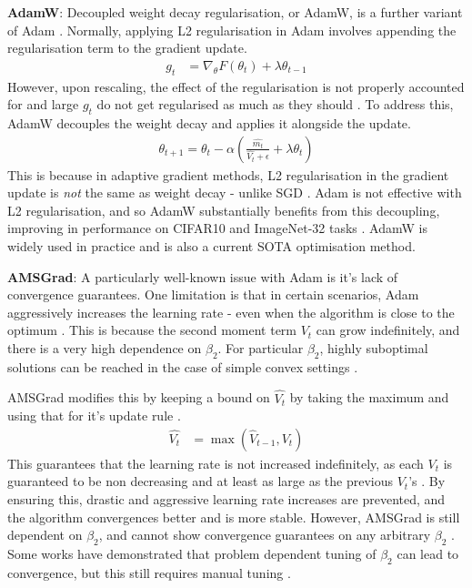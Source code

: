 \textbf{AdamW}: Decoupled weight decay regularisation, or AdamW, is a further variant of Adam \citep{loshchilov2017decoupled}. Normally, applying L2 regularisation in Adam involves appending the regularisation term to the gradient update.
\begin{align}
    g_t &= \nabla_{\theta} F(\theta_t) + \lambda \theta_{t-1}
\end{align}
However, upon rescaling, the effect of the regularisation is not properly accounted for and large $g_t$ do not get regularised as much as they should \citep{loshchilov2017decoupled}. To address this, AdamW decouples the weight decay and applies it alongside the update.
\begin{align}
    \theta_{t+1} = \theta_t - \alpha \left( \frac{\hat{m_t}}{\hat{V_t} + \epsilon} + \lambda \theta_t \right)
\end{align}
This is because in adaptive gradient methods, L2 regularisation in the gradient update is \textit{not} the same as weight decay - unlike SGD \citep{loshchilov2017decoupled}. Adam is not effective with L2 regularisation, and so AdamW substantially benefits from this decoupling, improving in performance on CIFAR10 and ImageNet-32 tasks \citep{loshchilov2017decoupled}. AdamW is widely used in practice and is also a current SOTA optimisation method.

\textbf{AMSGrad}: A particularly well-known issue with Adam is it's lack of convergence guarantees. One limitation is that in certain scenarios, Adam aggressively increases the learning rate - even when the algorithm is close to the optimum \citep{reddi2019asmgrad}. This is because the second moment term $V_t$ can grow indefinitely, and there is a very high dependence on $\beta_2$. For particular $\beta_2$, highly suboptimal solutions can be reached in the case of simple convex settings \citep{reddi2019asmgrad}.

AMSGrad modifies this by keeping a bound on $\hat{V_t}$ by taking the maximum and using that for it's update rule \citep{reddi2019asmgrad}.
\begin{align}
    \hat{V_{t}} &= \max(\hat{V}_{t-1}, V_t)
\end{align}
This guarantees that the learning rate is not increased indefinitely, as each $V_t$ is guaranteed to be non decreasing and at least as large as the previous $V_t$'s \citep{reddi2019asmgrad}. By ensuring this, drastic and aggressive learning rate increases are prevented, and the algorithm convergences better and is more stable. However, AMSGrad is still dependent on $\beta_2$, and cannot show convergence guarantees on any arbitrary $\beta_2$ \citep{taniguchi2024adopt}. Some works have demonstrated that problem dependent tuning of $\beta_2$ can lead to convergence, but this still requires manual tuning \citep{taniguchi2024adopt}.

